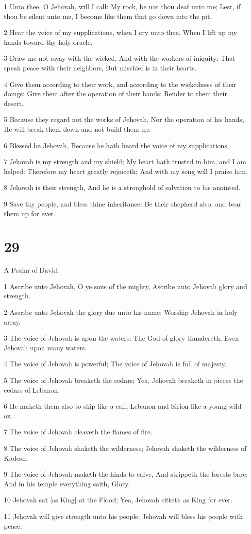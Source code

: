 \par 1 Unto thee, O Jehovah, will I call: My rock, be not thou deaf unto me; Lest, if thou be silent unto me, I become like them that go down into the pit.
\par 2 Hear the voice of my supplications, when I cry unto thee, When I lift up my hands toward thy holy oracle.
\par 3 Draw me not away with the wicked, And with the workers of iniquity; That speak peace with their neighbors, But mischief is in their hearts.
\par 4 Give them according to their work, and according to the wickedness of their doings: Give them after the operation of their hands; Render to them their desert.
\par 5 Because they regard not the works of Jehovah, Nor the operation of his hands, He will break them down and not build them up.
\par 6 Blessed be Jehovah, Because he hath heard the voice of my supplications.
\par 7 Jehovah is my strength and my shield; My heart hath trusted in him, and I am helped: Therefore my heart greatly rejoiceth; And with my song will I praise him.
\par 8 Jehovah is their strength, And he is a stronghold of salvation to his anointed.
\par 9 Save thy people, and bless thine inheritance: Be their shepherd also, and bear them up for ever.

\chapter{29}

\par A Psalm of David.

\par 1 Ascribe unto Jehovah, O ye sons of the mighty, Ascribe unto Jehovah glory and strength.
\par 2 Ascribe unto Jehovah the glory due unto his name; Worship Jehovah in holy array.
\par 3 The voice of Jehovah is upon the waters: The God of glory thundereth, Even Jehovah upon many waters.
\par 4 The voice of Jehovah is powerful; The voice of Jehovah is full of majesty.
\par 5 The voice of Jehovah breaketh the cedars; Yea, Jehovah breaketh in pieces the cedars of Lebanon.
\par 6 He maketh them also to skip like a calf; Lebanon and Sirion like a young wild-ox.
\par 7 The voice of Jehovah cleaveth the flames of fire.
\par 8 The voice of Jehovah shaketh the wilderness; Jehovah shaketh the wilderness of Kadesh.
\par 9 The voice of Jehovah maketh the hinds to calve, And strippeth the forests bare: And in his temple everything saith, Glory.
\par 10 Jehovah sat [as King] at the Flood; Yea, Jehovah sitteth as King for ever.
\par 11 Jehovah will give strength unto his people; Jehovah will bless his people with peace.


